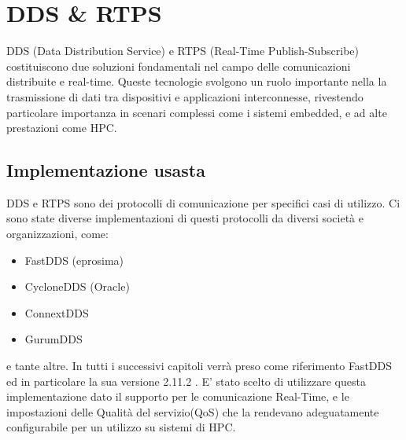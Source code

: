 \chapter{DDS \& RTPS}\label{Chapter:dds}
DDS (Data Distribution Service)\cite{DDS} e RTPS (Real-Time Publish-Subscribe)\cite{RTPS} costituiscono due soluzioni fondamentali nel campo delle comunicazioni distribuite e real-time. Queste tecnologie svolgono un ruolo importante nella la trasmissione di dati tra dispositivi e applicazioni interconnesse, rivestendo particolare importanza in scenari complessi come i sistemi embedded, e ad alte prestazioni come HPC. 


\section{Implementazione usasta}
DDS e RTPS sono dei protocolli di comunicazione per specifici casi di utilizzo. Ci sono state diverse implementazioni di questi protocolli da diversi società e organizzazioni, come:
\begin{itemize}
  \item FastDDS (eprosima)
  \item CycloneDDS (Oracle)
  \item ConnextDDS
  \item GurumDDS
\end{itemize}

e tante altre. In tutti i successivi capitoli verrà preso come riferimento FastDDS ed in particolare la sua versione 2.11.2 \cite{FastDDS}. E' stato scelto di utilizzare questa implementazione  dato il supporto per le comunicazione Real-Time, e le impostazioni delle Qualità del servizio(QoS) che la rendevano adeguatamente configurabile per un utilizzo su sistemi di HPC. %

